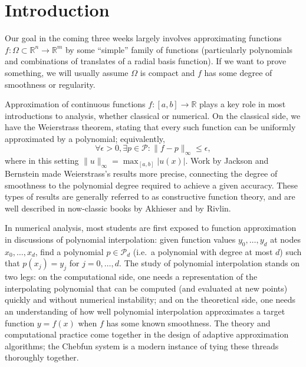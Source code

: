 \documentclass[12pt, leqno]{article} %
\begin{document}

\section{Introduction}

Our goal in the coming three weeks largely involves approximating
functions $f : \Omega \subset \mathbb{R}^n \rightarrow \mathbb{R}^m$
by some ``simple'' family of functions (particularly polynomials and
combinations of translates of a radial basis function).  If we want to
prove something, we will usually assume $\Omega$ is compact and $f$
has some degree of smoothness or regularity.

Approximation of continuous functions $f : [a, b] \rightarrow
\mathbb{R}$ plays a key role in most introductions to analysis,
whether classical or numerical.  On the classical side, we have the
Weierstrass theorem, stating that every such function can be uniformly
approximated by a polynomial; equivalently,
\[
  \forall \epsilon > 0, \exists p \in \mathcal{P} :
  \|f-p\|_\infty \leq \epsilon,
\]
where in this setting $\|u\|_\infty = \max_{[a,b]} |u(x)|$.  Work by
Jackson and Bernstein made Weierstrass's results more precise,
connecting the degree of smoothness to the polynomial degree required
to achieve a given accuracy.  These types of results are generally
referred to as constructive function theory, and are well described in
now-classic books by Akhieser and by Rivlin.

In numerical analysis, most students are first exposed to function
approximation in discussions of polynomial interpolation: given
function values $y_0, \ldots, y_d$ at nodes $x_0, \ldots, x_d$, find a
polynomial $p \in \mathcal{P}_d$ (i.e.~a polynomial with degree at
most $d$) such that $p(x_j) = y_j$ for $j = 0, \ldots, d$.  The study
of polynomial interpolation stands on two legs: on the computational
side, one needs a representation of the interpolating polynomial that
can be computed (and evaluated at new points) quickly and without
numerical instability; and on the theoretical side, one needs an
understanding of how well polynomial interpolation approximates a
target function $y = f(x)$ when $f$ has some known smoothness.
The theory and computational practice come together in the design of
adaptive approximation algorithms; the Chebfun system is a modern
instance of tying these threads thoroughly together.
\end{document}
